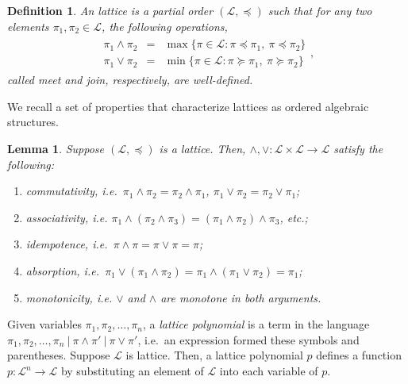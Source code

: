 \documentclass[conference]{ieeeconf}
\renewcommand{\L}{\mathcal{L}}
\newcommand{\join}{\vee}
\newcommand{\meet}{\wedge}
\newtheorem{lemma}{Lemma}
\newtheorem{definition}{Definition}
\begin{document}
\begin{definition} \label{def:lattice}
    An \emph{lattice} is a partial order $(\L, \preceq)$ such that for any two elements $\pi_1, \pi_2 \in \L$, the following operations,
    \begin{align*}
        \begin{aligned}
        \pi_1 \meet \pi_2 &=& \max\{ \pi \in \L: \pi \preceq \pi_1,~\pi \preceq \pi_2 \} \\
        \pi_1 \join \pi_2 &=& \min\{ \pi \in \L: \pi \succeq \pi_1,~\pi \succeq \pi_2 \}        
        \end{aligned},
    \end{align*}
    called \emph{meet} and \emph{join}, respectively, are well-defined. 
\end{definition}

We recall a set of properties that characterize lattices as ordered algebraic structures.

\begin{lemma} \label{lem:lattice-axiom} 
    Suppose $(\L,\preceq)$ is a lattice. Then, $\meet, \join: \L \times \L \to \L$ satisfy the following:
    \begin{enumerate}
        \item \emph{commutativity}, i.e.~$\pi_1 \meet \pi_2 = \pi_2 \meet \pi_1$, $\pi_1 \join \pi_2 = \pi_2 \join \pi_1$;
        \item \emph{associativity}, i.e. {\small $\pi_1 \meet (\pi_2 \meet \pi_3) = (\pi_1 \meet \pi_2) \meet \pi_3$}, etc.;
        \item \emph{idempotence}, i.e.~$\pi \meet \pi = \pi \join \pi =  \pi$;
        \item \emph{absorption}, i.e.~$\pi_1 \join \left( \pi_1 \meet \pi_2 \right) = \pi_1 \meet \left( \pi_1 \join \pi_2 \right) = \pi_1$;
        \item \emph{monotonicity}, i.e. $\join$ and $\meet$ are monotone in both arguments.
    \end{enumerate}
\end{lemma}

Given variables $\pi_1,\pi_2,\dots,\pi_n$, a \emph{lattice polynomial} is a term in the language $\pi_1,\pi_2,\dots,\pi_n~\vert~\pi \meet \pi'~\vert~\pi \join \pi'$, i.e.~an expression formed these symbols and parentheses. Suppose $\L$ is  lattice. Then, a lattice polynomial $p$ defines a function $p: \L^n \to \L$ by substituting an element of $\L$ into each variable of $p$.

\end{document}
